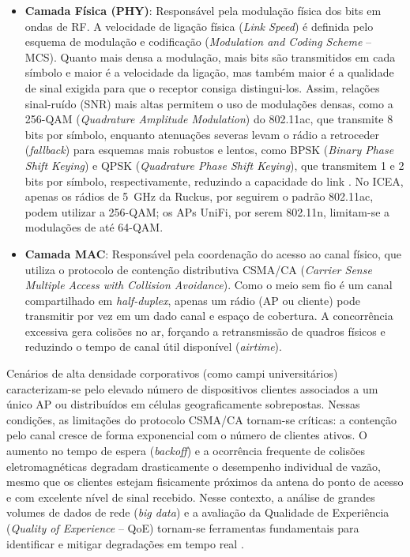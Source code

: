 \begin{itemize}
	\item \textbf{Camada Física (PHY)}: Responsável pela modulação física dos bits em ondas de RF. A velocidade de ligação física (\textit{Link Speed}) é definida pelo esquema de modulação e codificação (\textit{Modulation and Coding Scheme} -- MCS). Quanto mais densa a modulação, mais bits são transmitidos em cada símbolo e maior é a velocidade da ligação, mas também maior é a qualidade de sinal exigida para que o receptor consiga distingui-los. Assim, relações sinal-ruído (SNR) mais altas permitem o uso de modulações densas, como a 256-QAM (\textit{Quadrature Amplitude Modulation}) do 802.11ac, que transmite 8 bits por símbolo, enquanto atenuações severas levam o rádio a retroceder (\textit{fallback}) para esquemas mais robustos e lentos, como BPSK (\textit{Binary Phase Shift Keying}) e QPSK (\textit{Quadrature Phase Shift Keying}), que transmitem 1 e 2 bits por símbolo, respectivamente, reduzindo a capacidade do link \cite{gast2005}. No ICEA, apenas os rádios de 5~GHz da Ruckus, por seguirem o padrão 802.11ac, podem utilizar a 256-QAM; os APs UniFi, por serem 802.11n, limitam-se a modulações de até 64-QAM.
	\item \textbf{Camada MAC}: Responsável pela coordenação do acesso ao canal físico, que utiliza o protocolo de contenção distributiva CSMA/CA (\textit{Carrier Sense Multiple Access with Collision Avoidance}). Como o meio sem fio é um canal compartilhado em \textit{half-duplex}, apenas um rádio (AP ou cliente) pode transmitir por vez em um dado canal e espaço de cobertura. A concorrência excessiva gera colisões no ar, forçando a retransmissão de quadros físicos e reduzindo o tempo de canal útil disponível (\textit{airtime}).
\end{itemize}
 Cenários de alta densidade corporativos (como campi universitários) caracterizam-se pelo elevado número de dispositivos clientes associados a um único AP ou distribuídos em células geograficamente sobrepostas. Nessas condições, as limitações do protocolo CSMA/CA tornam-se críticas: a contenção pelo canal cresce de forma exponencial com o número de clientes ativos. O aumento no tempo de espera (\textit{backoff}) e a ocorrência frequente de colisões eletromagnéticas degradam drasticamente o desempenho individual de vazão, mesmo que os clientes estejam fisicamente próximos da antena do ponto de acesso e com excelente nível de sinal recebido. Nesse contexto, a análise de grandes volumes de dados de rede (\textit{big data}) e a avaliação da Qualidade de Experiência (\textit{Quality of Experience} -- QoE) tornam-se ferramentas fundamentais para identificar e mitigar degradações em tempo real \cite{qaiyum2016}.

